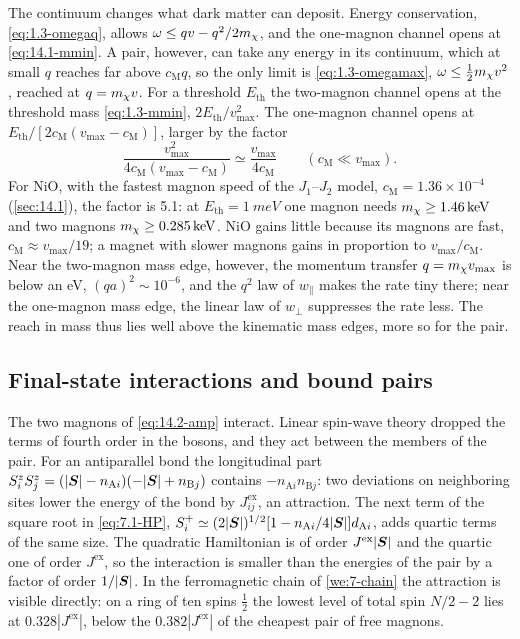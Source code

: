 The continuum changes what dark matter can deposit. Energy conservation, \cref{eq:1.3-omegaq}, allows $\omega \le qv - q^2/2m_{\chi}$, and the one-magnon channel opens at \cref{eq:14.1-mmin}. A pair, however, can take any energy in its continuum, which at small $q$ reaches far above $c_{\mathrm{M}}q$, so the only limit is \cref{eq:1.3-omegamax}, $\omega \le \frac12m_{\chi} v^2$, reached at $q = m_{\chi} v$. For a threshold $E_{\mathrm{th}}$ the two-magnon channel opens at the threshold mass \cref{eq:1.3-mmin}, $2E_{\mathrm{th}}/v_{\mathrm{max}}^2$. The one-magnon channel opens at $E_{\mathrm{th}}/[2c_{\mathrm{M}}(v_{\mathrm{max}} - c_{\mathrm{M}})]$, larger by the factor
\begin{equation}
  \frac{v_{\mathrm{max}}^2}{4c_{\mathrm{M}}(v_{\mathrm{max}} - c_{\mathrm{M}})} \simeq \frac{v_{\mathrm{max}}}{4c_{\mathrm{M}}} \qquad (c_{\mathrm{M}} \ll v_{\mathrm{max}}) .
  \label{eq:14.2-mratio}
\end{equation}
For NiO, with the fastest magnon speed of the $J_1$--$J_2$ model, $c_{\mathrm{M}} = 1.36\times10^{-4}$ (\cref{sec:14.1}), the factor is 5.1: at $E_{\mathrm{th}} = \SI{1}{meV}$ one magnon needs $m_{\chi} \ge \SI{1.46}{keV}$ and two magnons $m_{\chi} \ge \SI{0.285}{keV}$. NiO gains little because its magnons are fast, $c_{\mathrm{M}} \approx v_{\mathrm{max}}/19$; a magnet with slower magnons gains in proportion to $v_{\mathrm{max}}/c_{\mathrm{M}}$. Near the two-magnon mass edge, however, the momentum transfer $q = m_{\chi} v_{\mathrm{max}}$ is below an eV, $(qa)^2 \sim 10^{-6}$, and the $q^2$ law of $w_\parallel$ makes the rate tiny there; near the one-magnon mass edge, the linear law of $w_\perp$ suppresses the rate less. The reach in mass thus lies well above the kinematic mass edges, more so for the pair.

\subsection{Final-state interactions and bound pairs}\label{sec:14.2-fsi}

The two magnons of \cref{eq:14.2-amp} interact. Linear spin-wave theory dropped the terms of fourth order in the bosons, and they act between the members of the pair. For an antiparallel bond the longitudinal part $S^z_iS^z_j = (|\bm{S}| - n_{\mathrm{A}i})(-|\bm{S}| + n_{\mathrm{B}j})$ contains $-n_{\mathrm{A}i}n_{\mathrm{B}j}$: two deviations on neighboring sites lower the energy of the bond by $J^{\mathrm{ex}}_{ij}$, an attraction. The next term of the square root in \cref{eq:7.1-HP}, $S^+_i \simeq (2|\bm{S}|)^{1/2}[1 - n_{\mathrm{A}i}/4|\bm{S}|]d_{\mathrm{A}i}$, adds quartic terms of the same size. The quadratic Hamiltonian is of order $J^{\mathrm{ex}}|\bm{S}|$ and the quartic one of order $J^{\mathrm{ex}}$, so the interaction is smaller than the energies of the pair by a factor of order $1/|\bm{S}|$. In the ferromagnetic chain of \cref{we:7-chain} the attraction is visible directly: on a ring of ten spins $\frac12$ the lowest level of total spin $N/2 - 2$ lies at $0.328|J^{\mathrm{ex}}|$, below the $0.382|J^{\mathrm{ex}}|$ of the cheapest pair of free magnons.

